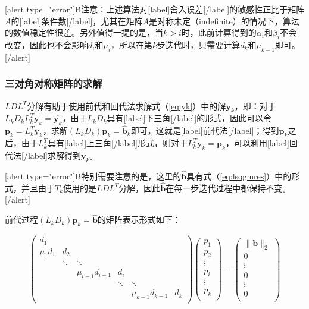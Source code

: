 \documentclass[UTF8,nofonts]{ctexart}
\begin{document}
[alert type="error"]B注意：上述算法对[label]舍入误差[/label]的敏感性正比于矩阵$A$的[label]条件数[/label]，尤其在矩阵$A$是对称未定（indefinite）的情况下，算法的数值稳定性很差。另外值得一提的是，当$k>i$时，此前计算得到的$\alpha_i$和$\beta_i$不会改变，因此也不会影响$d_i$和$\mu_i$，所以在第$k$步迭代时，只需要计算$d_k$和$\mu_{k-1}$即可。[/alert]

\subsubsection*{三对角对称矩阵的求解}

$LDL^T$分解有助于使用前代和回代法求解式（\ref{eq:yk}）中的解$\boldsymbol{y}_k$，即：对于$L_kD_kL_k^T\boldsymbol{y}_k=\hat{\boldsymbol{y}_k}$，由于$L_kD_k$具有[label]下三角[/label]的形式，因此可以令$\boldsymbol{p}_k=L_k^T\boldsymbol{y}_k$，求解$(L_kD_k)\boldsymbol{p}_k=\hat{\boldsymbol{b}}_k$即可，这就是[label]前代法[/label]；得到$\boldsymbol{p}_k$之后，由于$L_k^T$具有[label]上三角[/label]形式，则对于$L_k^T\boldsymbol{y}_k=\boldsymbol{p}_k$，可以利用[label]回代法[/label]求解得到$\boldsymbol{y}_k$。

[alert type="error"]B特别需要注意的是，这里的$\hat{\boldsymbol{b}}$具有式（\ref{eq:lsqgmres}）中的形式，并且由于$T_k$使用的是$LDL^T$分解，因此$\hat{\boldsymbol{b}}$在每一步迭代过程中都保持不变。[/alert]

前代过程$(L_kD_k)\boldsymbol{p}_k=\hat{\boldsymbol{b}}$的矩阵表示形式如下：

\begin{equation*}
	\label{eq:fwd}
	\begin{pmatrix}
		d_1 & & & & & \\
		\mu_1d_1 & d_2 & & & & \\
		& \ddots & \ddots & & & \\
		& & \mu_{i-1}d_{i-1} & d_i & & \\
		& & & \ddots & \ddots & \\
		& & & & \mu_{k-1}d_{k-1} & d_{k} \\
	\end{pmatrix}
	\begin{pmatrix}
		p_1 \\ p_2 \\ \vdots \\ p_i \\ \vdots \\ p_k \\
	\end{pmatrix}=
	\begin{pmatrix}
		\|\boldsymbol{b}\|_2 \\ 0 \\ \vdots \\ 0 \\ \vdots \\ 0 \\
	\end{pmatrix}
\end{equation*}
\end{document}
